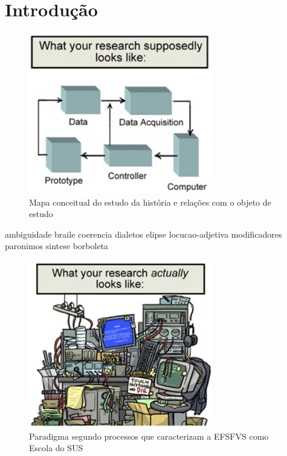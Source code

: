 \chapter{Introdução}
\label{chap:introducao}

\lipsum[2]

\begin{figure}[h!]
	\caption{Mapa conceitual do estudo da história e relações com o objeto de estudo}
	\label{fig_mapa}
	\begin{center}
		\includegraphics[width=8cm]{figuras/figura-1}		
	\end{center}
\end{figure}

\lipsum[2]
\lipsum[2]
\lipsum[2]

\Gls{ambiguidade}
\Gls{braile}
\Gls{coerencia}
\Gls{dialetos}
\Gls{elipse}
\Gls{locucao-adjetiva}
\Gls{modificadores}
\Gls{paronimos}
\Gls{sintese}
\Gls{borboleta}

\begin{figure}[h!]
	\caption{Paradigma segundo processos que caracterizam a EFSFVS como Escola do SUS}
	\label{fig_paradigma}
	\begin{center}
		\includegraphics[width=8cm]{figuras/figura-2}
	\end{center}
\end{figure}

